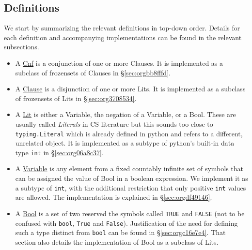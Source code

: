\documentclass[11pt]{article}
\begin{document}
\subsection{Definitions}
\label{sec:org0d0b4e5}
We start by summarizing the relevant definitions in top-down
order. Details for each definition and accompanying implementations
can be found in the relevant subsections.
\begin{itemize}
\item A \hyperref[sec:orgbb8fffd]{Cnf} is a conjunction of one or more Clauses. It is implemented as a subclass
of frozensets of Clauses in \S \ref{sec:orgbb8fffd}.
\item A \hyperref[sec:org3708534]{Clause} is a disjunction of one or more Lits. It is implemented as a subclass
of frozensets of Lits in \S \ref{sec:org3708534}.
\item A \hyperref[sec:org06a8c37]{Lit} is either a Variable, the negation of a Variable, or a Bool.  These are
usually called \emph{Literals} in CS literature but this sounds too close to
\texttt{typing.Literal} which is already defined in python and refers to a different,
unrelated object. It is implemented as a subtype of python's built-in data type
\texttt{int} in \S \ref{sec:org06a8c37}.
\item A \hyperref[sec:orgdf49146]{Variable} is any element from a fixed countably infinite set of symbols that
can be assigned the value of Bool in a boolean expression. We implement it as
a subtype of \texttt{int}, with the additional restriction that only positive \texttt{int}
values are allowed. The implementation is explained in \S \ref{sec:orgdf49146}.
\item A \hyperref[sec:orgc16e7e4]{Bool} is a set of two reserved the symbols called \texttt{TRUE} and \texttt{FALSE} (not to
be confused with \texttt{bool}, \texttt{True} and \texttt{False}).  Justification of the need for
defining such a type distinct from \texttt{bool} can be found in \S \ref{sec:orgc16e7e4}. That
section also details the implementation of Bool as a subclass of Lits.
\end{itemize}

\newpage
\end{document}
